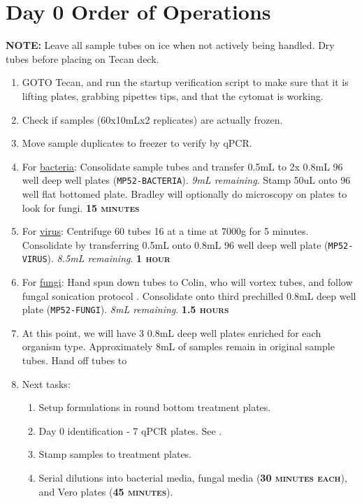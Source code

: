\documentclass{article}
\begin{document}
\section{Day 0 Order of Operations} \label{day0instructions}
\textbf{NOTE:} Leave all sample tubes on ice when not actively being handled. Dry tubes before placing on Tecan deck.
\begin{enumerate}
    \item GOTO Tecan, and run the startup verification script to make sure that it is lifting plates, grabbing pipettes tips, and that the cytomat is working. 
    \item Check if samples (60x10mLx2 replicates) are actually frozen. 
    \item Move sample duplicates to freezer to verify by qPCR.
    \item For \ul{bacteria}: Consolidate sample tubes and transfer 0.5mL to 2x 0.8mL 96 well deep well plates (\texttt{MP52-BACTERIA}). \textit{9mL remaining}. Stamp 50uL onto 96 well flat bottomed plate.  Bradley will optionally do microscopy on plates to look for fungi.  \textbf{\textsc{15 minutes}}
    
    \item For \ul{virus}: Centrifuge 60 tubes 16 at a time at 7000g for 5 minutes. Consolidate by transferring 0.5mL onto 0.8mL 96 well deep well plate (\texttt{MP52-VIRUS}). \textit{8.5mL remaining}. \textbf{\textsc{1 hour}}
    \item For \ul{fungi}: Hand spun down tubes to Colin, who will vortex tubes, and follow fungal sonication protocol . Consolidate onto third prechilled 0.8mL deep well plate (\texttt{MP52-FUNGI}). \textit{8mL remaining}. \textbf{\textsc{1.5 hours}}
    \item At this point, we will have 3 0.8mL deep well plates enriched for each organism type. Approximately 8mL of samples remain in original sample tubes. Hand off tubes to 
    \item Next tasks:
    \begin{enumerate}
    \item Setup formulations in round bottom treatment plates.
        \item Day 0 identification - 7 qPCR plates. See .
        \item Stamp samples to treatment plates.
        \item Serial dilutions into bacterial media, fungal media (\textbf{\textsc{30 minutes each}}), and Vero plates (\textbf{\textsc{45 minutes}}).
    \end{enumerate}
    

\end{enumerate}
\end{document}
